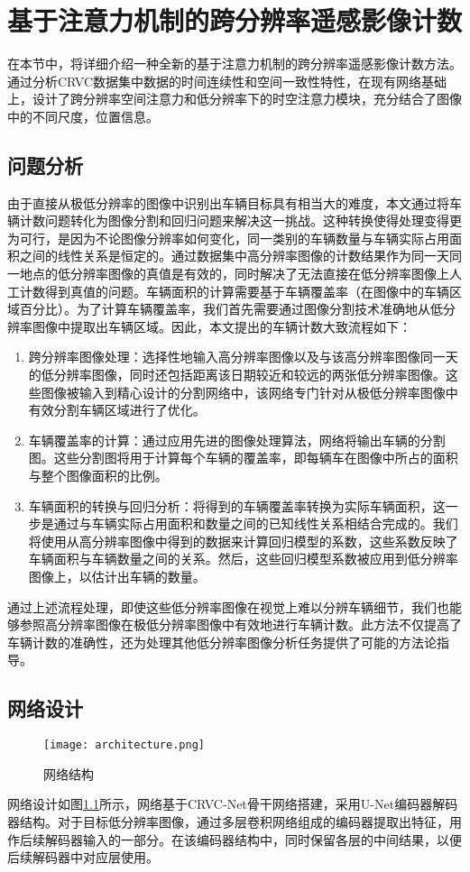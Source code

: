 
\chapter{基于注意力机制的跨分辨率遥感影像计数}
在本节中，将详细介绍一种全新的基于注意力机制的跨分辨率遥感影像计数方法。通过分析CRVC数据集中数据的时间连续性和空间一致性特性，在现有网络基础上，设计了跨分辨率空间注意力和低分辨率下的时空注意力模块，充分结合了图像中的不同尺度，位置信息。
\section{问题分析}
由于直接从极低分辨率的图像中识别出车辆目标具有相当大的难度，本文通过将车辆计数问题转化为图像分割和回归问题来解决这一挑战。这种转换使得处理变得更为可行，是因为不论图像分辨率如何变化，同一类别的车辆数量与车辆实际占用面积之间的线性关系是恒定的。通过数据集中高分辨率图像的计数结果作为同一天同一地点的低分辨率图像的真值是有效的，同时解决了无法直接在低分辨率图像上人工计数得到真值的问题。车辆面积的计算需要基于车辆覆盖率（在图像中的车辆区域百分比）。为了计算车辆覆盖率，我们首先需要通过图像分割技术准确地从低分辨率图像中提取出车辆区域。因此，本文提出的车辆计数大致流程如下：
\begin{enumerate}    
\item 跨分辨率图像处理：选择性地输入高分辨率图像以及与该高分辨率图像同一天的低分辨率图像，同时还包括距离该日期较近和较远的两张低分辨率图像。这些图像被输入到精心设计的分割网络中，该网络专门针对从极低分辨率图像中有效分割车辆区域进行了优化。
\item 车辆覆盖率的计算：通过应用先进的图像处理算法，网络将输出车辆的分割图。这些分割图将用于计算每个车辆的覆盖率，即每辆车在图像中所占的面积与整个图像面积的比例。
\item 车辆面积的转换与回归分析：将得到的车辆覆盖率转换为实际车辆面积，这一步是通过与车辆实际占用面积和数量之间的已知线性关系相结合完成的。我们将使用从高分辨率图像中得到的数据来计算回归模型的系数，这些系数反映了车辆面积与车辆数量之间的关系。然后，这些回归模型系数被应用到低分辨率图像上，以估计出车辆的数量。
\end{enumerate}
通过上述流程处理，即使这些低分辨率图像在视觉上难以分辨车辆细节，我们也能够参照高分辨率图像在极低分辨率图像中有效地进行车辆计数。此方法不仅提高了车辆计数的准确性，还为处理其他低分辨率图像分析任务提供了可能的方法论指导。
\section{网络设计}
\begin{figure}[h]
    \centering
    \texttt{[image: architecture.png]}
    \caption{网络结构}
    \label{fig:architecture}
  \end{figure}
网络设计如图\ref{fig:architecture}所示，网络基于CRVC-Net骨干网络搭建，采用U-Net编码器解码器结构。对于目标低分辨率图像，通过多层卷积网络组成的编码器提取出特征，用作后续解码器输入的一部分。在该编码器结构中，同时保留各层的中间结果，以便后续解码器中对应层使用。


